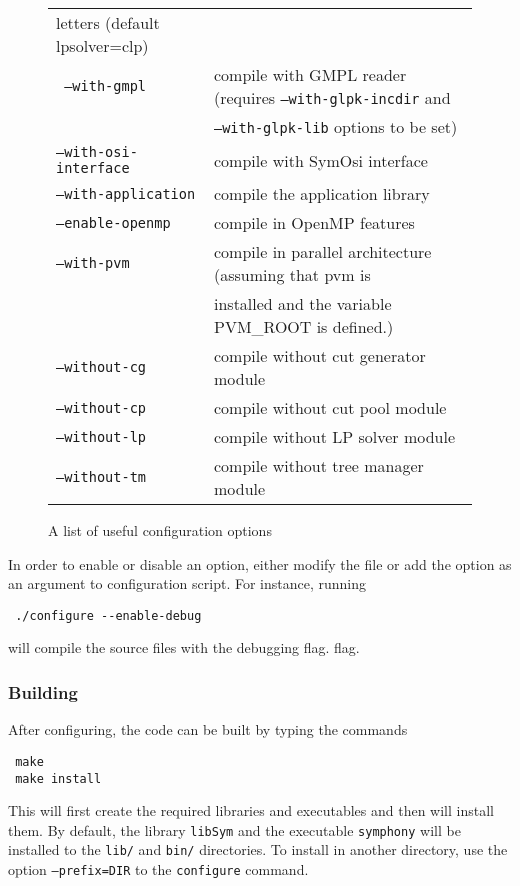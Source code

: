 \begin{figure}[htb]
\begin{tabular}{ll}
letters (default lpsolver=clp) \\
\texttt{ --with-gmpl} &  compile with GMPL reader (requires 
\texttt{--with-glpk-incdir} and \\ &
\texttt{--with-glpk-lib} options to be set) \\
\texttt{--with-osi-interface} &  compile with SymOsi interface \\
\texttt{--with-application} &  compile the application library \\
\hline
\texttt{--enable-openmp} &   compile in OpenMP features \\
\texttt{--with-pvm } &  compile in parallel architecture (assuming that pvm is \\ 
&installed and the variable PVM\_ROOT is defined.) \\
\texttt{--without-cg} &  compile without cut generator module \\
\texttt{--without-cp} &  compile without cut pool module \\
\texttt{--without-lp} &  compile without LP solver module \\
\texttt{--without-tm} &  compile without tree manager module
\end{tabular}
\caption{A list of useful configuration options \label{conf_opts}}
\end{figure}

In order to enable or disable an option, either modify the file
 or add the option as an argument to configuration
script. For instance, running 
{\color{Brown}
\begin{verbatim}
 ./configure --enable-debug
\end{verbatim}
}
will compile the source files with the debugging flag.
flag. 

\subsubsection{Building}\label{building}

After configuring, the code can be built by typing the commands
{\color{Brown}
\begin{verbatim}
 make
 make install
\end{verbatim}
} This will first create the required libraries and executables and then will
install them. By default, the library {\color{Brown}\texttt{libSym}} and the
executable {\color{Brown}\texttt{symphony}} will be installed to the
{\color{Brown}\texttt{lib/}} and {\color{Brown}\texttt{bin/}} directories. To
install in another directory, use the option
{\color{Brown}\texttt{--prefix=DIR}} to the {\color{Brown}\texttt{configure}}
command.

